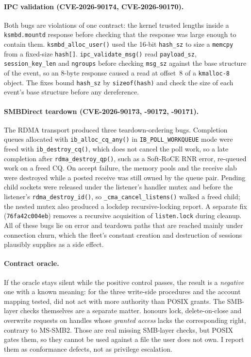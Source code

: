 \documentclass{article}
\begin{document}
\paragraph{IPC validation (CVE-2026-90174, CVE-2026-90170).} Both bugs are
violations of one contract: the kernel trusted lengths inside a
\texttt{ksmbd.mountd} response before checking that the response was large
enough to contain them. \texttt{ksmbd\_alloc\_user()} used the 16-bit
\texttt{hash\_sz} to size a \texttt{memcpy} from a fixed-size \texttt{hash[]}.
\texttt{ipc\_validate\_msg()} read \texttt{payload\_sz},
\texttt{session\_key\_len} and \texttt{ngroups} before checking
\texttt{msg\_sz} against the base structure of the event, so an 8-byte
response caused a read at offset~8 of a \texttt{kmalloc-8} object. The fixes
bound \texttt{hash\_sz} by \texttt{sizeof(hash)} and check the size of each
event's base structure before any dereference.

\paragraph{SMBDirect teardown (CVE-2026-90173, -90172, -90171).} The RDMA
transport produced three teardown-ordering bugs. Completion queues allocated
with \texttt{ib\_alloc\_cq\_any()} in \texttt{IB\_POLL\_WORKQUEUE} mode were
freed with \texttt{ib\_destroy\_cq()}, which does not cancel the poll work, so
a late completion after \texttt{rdma\_destroy\_qp()}, such as a Soft-RoCE RNR
error, re-queued work on a freed CQ. On accept failure, the memory pools and
the receive slab were destroyed while a posted receive was still owned by the
queue pair. Pending child sockets were released under the listener's handler
mutex and before the listener's \texttt{rdma\_destroy\_id()}, so
\texttt{\_cma\_cancel\_listens()} walked a freed child; the nested mutex also
produced a lockdep recursive-locking report. A separate fix
(\texttt{76fa42c004eb}) removes a recursive acquisition of
\texttt{listen.lock} during cleanup. All of these bugs lie on error and
teardown paths that are reached mainly under connection churn, which the
fleet's constant creation and destruction of sessions plausibly supplies as a
side effect.

\paragraph{Contract oracle.}  If the oracle stays silent
while the positive control passes, the result is a \emph{negative} one with a
known meaning: for the three write-side procedures and the account mapping
tested, \ksmbd did not act with more authority than POSIX grants. The
SMB-layer checks themselves are a separate matter. \ksmbd honours lock, delete-on-close and overwrite requests on handles
whose \emph{granted access} lacks the corresponding right, contrary to
MS-SMB2. Those are real missing SMB-layer checks, but POSIX gates them, so they
cannot be used against a file the user does not own. I report them as
conformance defects, not as privilege escalation.
\end{document}
